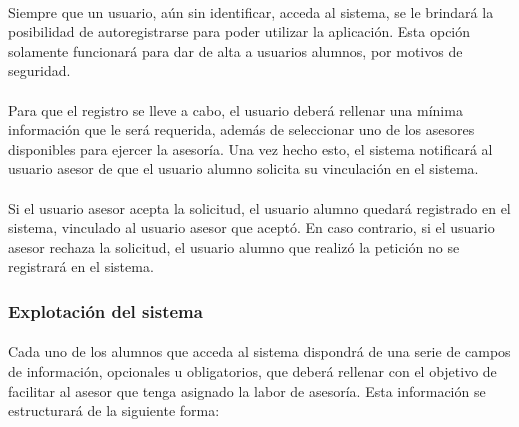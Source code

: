       \paragraph{}Siempre que un usuario, aún sin identificar, acceda al
      sistema, se le brindará la posibilidad de autoregistrarse para poder
      utilizar la aplicación. Esta opción solamente funcionará para dar de alta
      a usuarios alumnos, por motivos de seguridad.

      \paragraph{}Para que el registro se lleve a cabo, el usuario deberá
      rellenar una mínima información que le será requerida, además de
      seleccionar uno de los asesores disponibles para ejercer la asesoría. Una
      vez hecho esto, el sistema notificará al usuario asesor de que el usuario
      alumno solicita su vinculación en el sistema.

      \paragraph{}Si el usuario asesor acepta la solicitud, el usuario alumno
      quedará registrado en el sistema, vinculado al usuario asesor que aceptó.
      En caso contrario, si el usuario asesor rechaza la solicitud, el usuario
      alumno que realizó la petición no se registrará en el sistema.

      \subsubsection{Explotación del sistema}

      \paragraph{}Cada uno de los alumnos que acceda al sistema dispondrá
      de una serie de campos de información, opcionales u obligatorios, que
      deberá rellenar con el objetivo de facilitar al asesor que tenga asignado
      la labor de asesoría. Esta información se estructurará de la siguiente
      forma:

